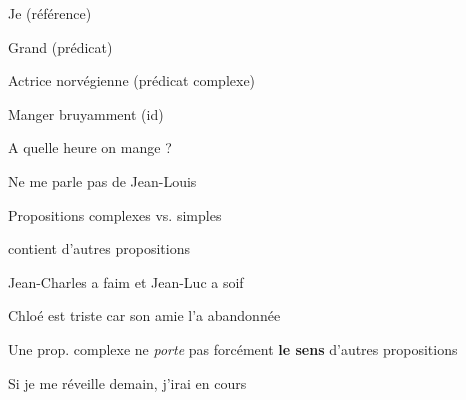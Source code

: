 \begin{frame}
	
	\begin{description}[labelindent=6pt,style=multiline,leftmargin=1.3in]
		 \setlength\itemsep{1.4em}

\item[`Petites` expressions] Je (référence)
\pause
\item[] Grand (prédicat) \pause
\item[] Actrice norvégienne (prédicat complexe) \pause
\item[] Manger bruyamment (id) \pause
\item[Interrogatives] A quelle heure on mange ? \pause
\item[Impératives] Ne me parle pas de Jean-Louis 
\end{description}
\end{frame}



\begin{frame}
	Propositions complexes vs. simples \newline
	\pause
	
	\begin{description}[labelindent=6pt,style=multiline,leftmargin=1.3in]
		 \setlength\itemsep{1.4em}

\item[Complexe] contient d'autres propositions \pause
\item[Exemples] Jean-Charles a faim et Jean-Luc a soif\pause
\item[] Chloé est triste car son amie l'a abandonnée\pause
\item[Attention] Une prop. complexe ne \textit{porte} pas forcément \textbf{le sens} d'autres propositions \pause
\item[Exemple] Si je me réveille demain, j'irai en cours
\end{description}
\end{frame}


